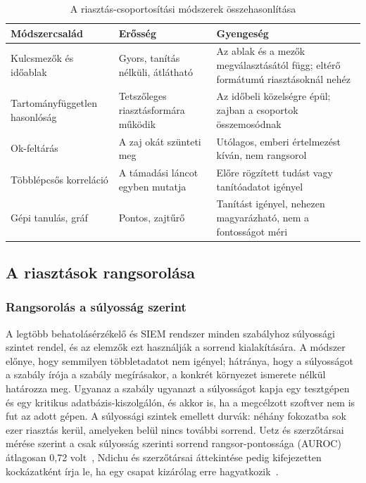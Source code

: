 \begin{table}[H]
    \centering
    \caption{A riasztás-csoportosítási módszerek összehasonlítása}
    \label{tab:csoportositas}
    \small
    \begin{tabular}{|L{3.4cm}|L{5.0cm}|L{5.2cm}|}
        \hline
        \textbf{Módszercsalád} & \textbf{Erősség} & \textbf{Gyengeség} \\ \hline
        Kulcsmezők és időablak & Gyors, tanítás nélküli, átlátható & Az ablak és a mezők megválasztásától függ; eltérő formátumú riasztásoknál nehéz \\ \hline
        Tartomány\-független hasonlóság & Tetszőleges riasztásformára működik & Az időbeli közelségre épül; zajban a csoportok összemosódnak \\ \hline
        Ok-feltárás & A zaj okát szünteti meg & Utólagos, emberi értelmezést kíván, nem rangsorol \\ \hline
        Többlépcsős korreláció & A támadási láncot egyben mutatja & Előre rögzített tudást vagy tanítóadatot igényel \\ \hline
        Gépi tanulás, gráf & Pontos, zajtűrő & Tanítást igényel, nehezen magyarázható, nem a fontosságot méri \\ \hline
    \end{tabular}
\end{table}

\subsection{A riasztások rangsorolása}\label{sec:rangsorolas}

\subsubsection{Rangsorolás a súlyosság szerint}
A legtöbb behatolásérzékelő és \ac{SIEM} rendszer minden szabályhoz súlyossági szintet rendel, és az elemzők ezt használják a sorrend kialakítására. A módszer előnye, hogy semmilyen többletadatot nem igényel; hátránya, hogy a súlyosságot a szabály írója a szabály megírásakor, a konkrét környezet ismerete nélkül határozza meg. Ugyanaz a szabály ugyanazt a súlyosságot kapja egy tesztgépen és egy kritikus adatbázis-kiszolgálón, és akkor is, ha a megcélzott szoftver nem is fut az adott gépen. A súlyossági szintek emellett durvák: néhány fokozatba sok ezer riasztás kerül, amelyeken belül nincs további sorrend. Uetz és szerzőtársai mérése szerint a csak súlyosság szerinti sorrend rangsor-pontossága (\ac{AUROC}) átlagosan 0,72 volt~\cite{uetz2026rba}, Ndichu és szerzőtársai áttekintése pedig kifejezetten kockázatként írja le, ha egy csapat kizárólag erre hagyatkozik~\cite{ndichu2026}.

